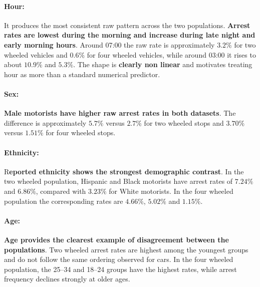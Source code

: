 \paragraph{Hour:} It produces the most consistent raw pattern across the two populations. \textbf{Arrest rates are lowest during the morning and increase during late night and early morning hours}. Around 07:00 the raw rate is approximately $3.2\%$ for two wheeled vehicles and $0.6\%$ for four wheeled vehicles, while around 03:00 it rises to about $10.9\%$ and $5.3\%$. The shape is \textbf{clearly non linear} and motivates treating hour as more than a standard numerical predictor.

\paragraph{Sex:} \textbf{Male motorists have higher raw arrest rates in both datasets}. The difference is approximately $5.7\%$ versus $2.7\%$ for two wheeled stops and $3.70\%$ versus $1.51\%$ for four wheeled stops.

\paragraph{Ethnicity:} R\textbf{eported ethnicity shows the strongest demographic contrast}. In the two wheeled population, Hispanic and Black motorists have arrest rates of $7.24\%$ and $6.86\%$, compared with $3.23\%$ for White motorists. In the four wheeled population the corresponding rates are $4.66\%$, $5.02\%$ and $1.15\%$.

\paragraph{Age:} \textbf{Age provides the clearest example of disagreement between the populations}. Two wheeled arrest rates are highest among the youngest groups and do not follow the same ordering observed for cars. In the four wheeled population, the 25--34 and 18--24 groups have the highest rates, while arrest frequency declines strongly at older ages.

